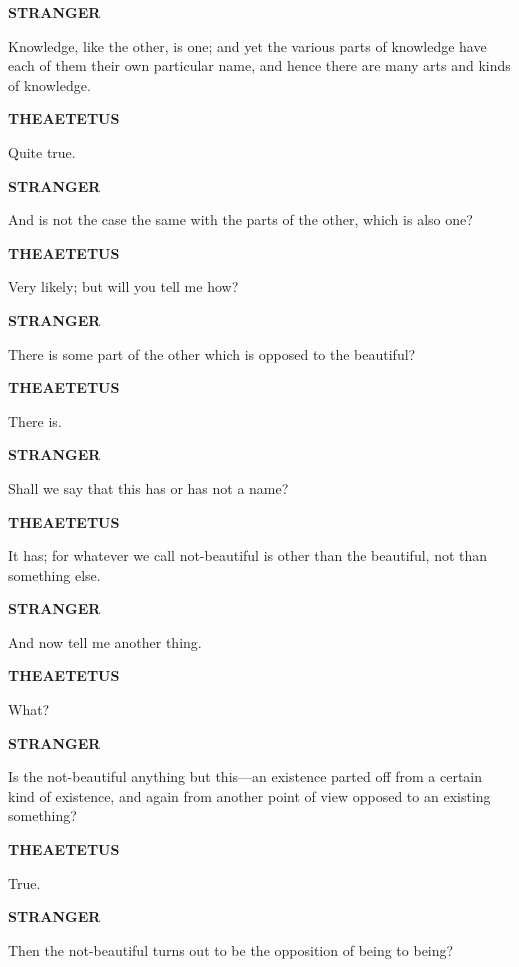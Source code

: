 \documentclass[11pt,letter]{article}
\begin{document}
\par \textbf{STRANGER}
\par   Knowledge, like the other, is one; and yet the various parts of knowledge have each of them their own particular name, and hence there are many arts and kinds of knowledge.

\par \textbf{THEAETETUS}
\par   Quite true.

\par \textbf{STRANGER}
\par   And is not the case the same with the parts of the other, which is also one?

\par \textbf{THEAETETUS}
\par   Very likely; but will you tell me how?

\par \textbf{STRANGER}
\par   There is some part of the other which is opposed to the beautiful?

\par \textbf{THEAETETUS}
\par   There is.

\par \textbf{STRANGER}
\par   Shall we say that this has or has not a name?

\par \textbf{THEAETETUS}
\par   It has; for whatever we call not-beautiful is other than the beautiful, not than something else.

\par \textbf{STRANGER}
\par   And now tell me another thing.

\par \textbf{THEAETETUS}
\par   What?

\par \textbf{STRANGER}
\par   Is the not-beautiful anything but this—an existence parted off from a certain kind of existence, and again from another point of view opposed to an existing something?

\par \textbf{THEAETETUS}
\par   True.

\par \textbf{STRANGER}
\par   Then the not-beautiful turns out to be the opposition of being to being?
\end{document}
